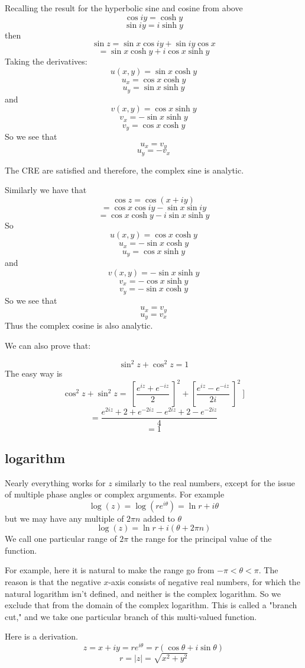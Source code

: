 \documentclass[11pt, oneside]{article}   	%
\begin{document}
Recalling the result for the hyperbolic sine and cosine from above
\[ \cos iy = \cosh y \]
\[ \sin i y =  i \sinh y \]
then
\[ \sin z = \sin x \cos iy + \sin iy \cos x \]
\[ = \sin x \cosh y + i \cos x \sinh y \]
Taking the derivatives:
\[ u(x,y) =  \sin x \cosh y \]
\[ u_x = \cos x \cosh y \]
\[ u_y = \sin x \sinh y \]
and
\[ v(x,y) = \cos x \sinh y \]
\[ v_x = - \sin x \sinh y \]
\[ v_y = \cos x \cosh y \]
So we see that
\[ u_x = v_y \]
\[ u_y = -v_x \]

The CRE are satisfied and therefore, the complex sine is analytic.

Similarly we have that 
\[ \cos z = \cos (x + iy) \]
\[ = \cos x \cos iy - \sin x \sin iy \]
\[ = \cos x \cosh y - i \sin x \sinh y \]
So
\[ u(x,y) =  \cos x \cosh y \]
\[ u_x = - \sin x \cosh y \]
\[ u_y = \cos x \sinh y \]
and
\[ v(x,y) = -\sin x \sinh y \]
\[ v_x = -\cos x \sinh y \]
\[ v_y = -\sin x \cosh y \]
So we see that
\[ u_x = v_y \]
\[ u_y = v_x \]
Thus the complex cosine is also analytic.

We can also prove that:

\[ \sin^2 z + \cos^2 z = 1 \]
The easy way is
\[ \cos^2 z + \sin^2 z = \ [ \frac{e^{iz} + e^{-iz}}{2} \ ]^2 +  [ \frac{e^{iz} - e^{-iz}}{2i} \ ]^2 \ ] \]
\[= \frac{e^{2iz} + 2 + e^{-2iz} - e^{2iz} + 2 - e^{-2iz} }{4} \]
\[ = 1 \]

\subsection*{logarithm}

Nearly everything works for $z$ similarly to the real numbers, except for the issue of multiple phase angles or complex arguments.  For example
\[ \log(z) = \log(re^{i\theta}) = \ln r + i \theta \]
but we may have any multiple of $2 \pi n$ added to $\theta$
\[ \log(z) = \ln r + i (\theta + 2 \pi n) \]
We call one particular range of $2 \pi$ the range for the principal value of the function.  

For example, here it is natural to make the range go from $-\pi < \theta < \pi$.  The reason is that the negative $x$-axis consists of negative real numbers, for which the natural logarithm isn't defined, and neither is the complex logarithm.  So we exclude that from the domain of the complex logarithm.  This is called a "branch cut," and we take one particular branch of this multi-valued function.

Here is a derivation.  
\[ z = x + iy = re^{i\theta} = r(\cos \theta + i \sin \theta) \]
\[ r = |z| = \sqrt{x^2 + y^2} \]
\end{document}
